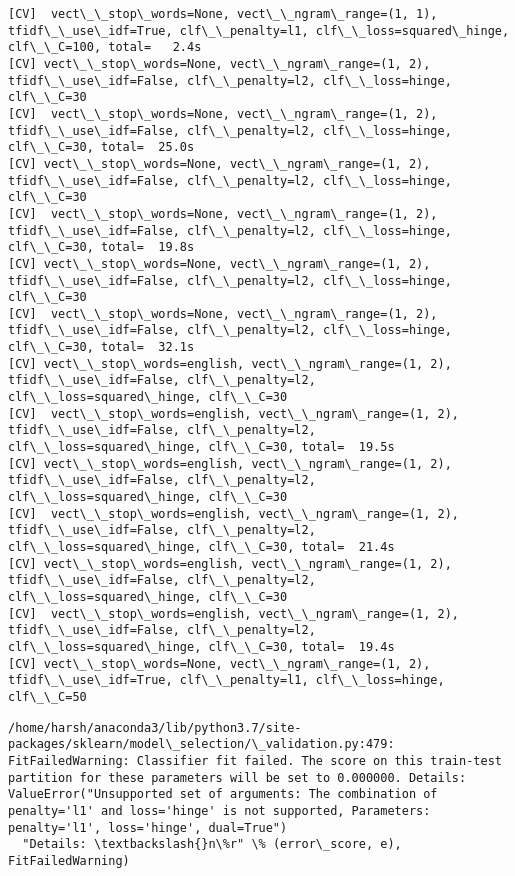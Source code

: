 \documentclass[11pt]{article}
\begin{document}
    \begin{Verbatim}[commandchars=\\\{\}]
[CV]  vect\_\_stop\_words=None, vect\_\_ngram\_range=(1, 1), tfidf\_\_use\_idf=True, clf\_\_penalty=l1, clf\_\_loss=squared\_hinge, clf\_\_C=100, total=   2.4s
[CV] vect\_\_stop\_words=None, vect\_\_ngram\_range=(1, 2), tfidf\_\_use\_idf=False, clf\_\_penalty=l2, clf\_\_loss=hinge, clf\_\_C=30 
[CV]  vect\_\_stop\_words=None, vect\_\_ngram\_range=(1, 2), tfidf\_\_use\_idf=False, clf\_\_penalty=l2, clf\_\_loss=hinge, clf\_\_C=30, total=  25.0s
[CV] vect\_\_stop\_words=None, vect\_\_ngram\_range=(1, 2), tfidf\_\_use\_idf=False, clf\_\_penalty=l2, clf\_\_loss=hinge, clf\_\_C=30 
[CV]  vect\_\_stop\_words=None, vect\_\_ngram\_range=(1, 2), tfidf\_\_use\_idf=False, clf\_\_penalty=l2, clf\_\_loss=hinge, clf\_\_C=30, total=  19.8s
[CV] vect\_\_stop\_words=None, vect\_\_ngram\_range=(1, 2), tfidf\_\_use\_idf=False, clf\_\_penalty=l2, clf\_\_loss=hinge, clf\_\_C=30 
[CV]  vect\_\_stop\_words=None, vect\_\_ngram\_range=(1, 2), tfidf\_\_use\_idf=False, clf\_\_penalty=l2, clf\_\_loss=hinge, clf\_\_C=30, total=  32.1s
[CV] vect\_\_stop\_words=english, vect\_\_ngram\_range=(1, 2), tfidf\_\_use\_idf=False, clf\_\_penalty=l2, clf\_\_loss=squared\_hinge, clf\_\_C=30 
[CV]  vect\_\_stop\_words=english, vect\_\_ngram\_range=(1, 2), tfidf\_\_use\_idf=False, clf\_\_penalty=l2, clf\_\_loss=squared\_hinge, clf\_\_C=30, total=  19.5s
[CV] vect\_\_stop\_words=english, vect\_\_ngram\_range=(1, 2), tfidf\_\_use\_idf=False, clf\_\_penalty=l2, clf\_\_loss=squared\_hinge, clf\_\_C=30 
[CV]  vect\_\_stop\_words=english, vect\_\_ngram\_range=(1, 2), tfidf\_\_use\_idf=False, clf\_\_penalty=l2, clf\_\_loss=squared\_hinge, clf\_\_C=30, total=  21.4s
[CV] vect\_\_stop\_words=english, vect\_\_ngram\_range=(1, 2), tfidf\_\_use\_idf=False, clf\_\_penalty=l2, clf\_\_loss=squared\_hinge, clf\_\_C=30 
[CV]  vect\_\_stop\_words=english, vect\_\_ngram\_range=(1, 2), tfidf\_\_use\_idf=False, clf\_\_penalty=l2, clf\_\_loss=squared\_hinge, clf\_\_C=30, total=  19.4s
[CV] vect\_\_stop\_words=None, vect\_\_ngram\_range=(1, 2), tfidf\_\_use\_idf=True, clf\_\_penalty=l1, clf\_\_loss=hinge, clf\_\_C=50 

    \end{Verbatim}

    \begin{Verbatim}[commandchars=\\\{\}]
/home/harsh/anaconda3/lib/python3.7/site-packages/sklearn/model\_selection/\_validation.py:479: FitFailedWarning: Classifier fit failed. The score on this train-test partition for these parameters will be set to 0.000000. Details: 
ValueError("Unsupported set of arguments: The combination of penalty='l1' and loss='hinge' is not supported, Parameters: penalty='l1', loss='hinge', dual=True")
  "Details: \textbackslash{}n\%r" \% (error\_score, e), FitFailedWarning)

    \end{Verbatim}
\end{document}
